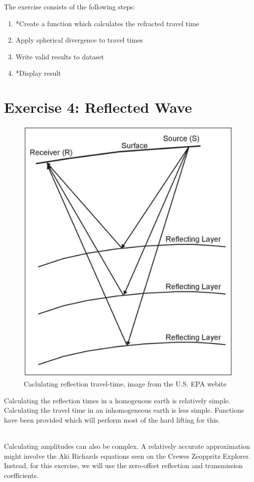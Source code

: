 \documentclass[a4paper, 10pt]{article}
\begin{document}
The exercise consists of the following steps:

\begin{enumerate}
\item *Create a function which calculates the refracted travel time
\item Apply spherical divergence to travel times
\item Write valid results to dataset
\item *Display result
\end{enumerate}

\newpage
\section*{Exercise 4: Reflected Wave}
\begin{figure}[h]
\centering
\includegraphics[scale=2.0]{reflection.jpg}
\caption{Caclulating reflection travel-time, image from the U.S. EPA webite}
\end{figure}

Calculating the reflection times in a homogenous earth is relatively simple.  Calculating the travel time in an inhomogeneous earth is less simple.  Functions have been provided which will perform most of the hard lifting for this.
\par~\\
Calculating amplitudes can also be complex.  A relatively accurate approximation might involve the Aki \- Richards equations seen on the Crewes Zeoppritz Explorer.  Instead, for this exercise,  we will use the zero-offset reflection and transmission coefficients.
\end{document}
